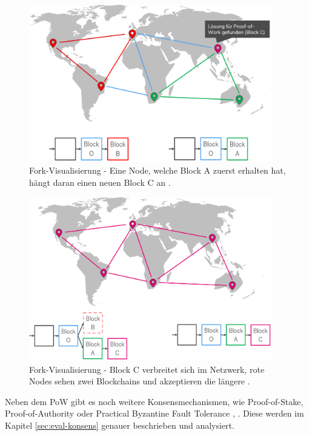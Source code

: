 \begin{figure}[!htbp]
  \centering
	\includegraphics[width=0.95\textwidth,angle=0]{images/fork_3}
 	\caption{Fork-Visualisierung - Eine Node, welche Block A zuerst erhalten hat, hängt daran einen neuen Block C an \cite[S.~200 ff.]{AntonopoulosMasteringbitcoin2015}.}
	\label{fig:fork_3}
\end{figure}

\begin{figure}[!htbp]
  \centering
	\includegraphics[width=0.95\textwidth,angle=0]{images/fork_4}
 	\caption{Fork-Visualisierung - Block C verbreitet sich im Netzwerk, rote Nodes sehen zwei Blockchains und akzeptieren die längere \cite[S.~200 ff.]{AntonopoulosMasteringbitcoin2015}.}
	\label{fig:fork_4}
\end{figure}

Neben dem \acs{PoW} gibt es noch weitere Konsensmechanismen, wie Proof-of-Stake, Proof-of-Authority oder Practical Byzantine Fault Tolerance \cite{SukhwaniPerformanceModelingPBFT2017a}, \cite{DeAngelisPBFTvsproofofauthority2017}. Diese werden im Kapitel \ref{sec:eval-konsens} genauer beschrieben und analysiert.

